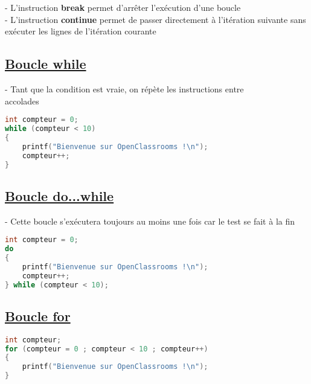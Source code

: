 \documentclass[a3paper,12pt]{article}
\begin{document}
\begin{minipage}[t]{0.49\textwidth}
\begin{tcolorbox}[title=Boucles, fonttitle=\large, top=3pt, bottom=3pt, boxsep=1pt, colback=white,
  colframe=lightpurple, 
  colbacktitle=lightpurple,
  coltitle=white,]
  
- L’instruction  \textbf{break}  permet d'arrêter l’exécution d’une boucle\\

- L’instruction  \textbf{continue}  permet de passer directement à l’itération suivante sans exécuter les lignes de l’itération courante
\subsection*{{\small \underline{Boucle while}}}
- Tant que la condition est vraie, on répète les instructions entre\\ accolades
\begin{lstlisting}[language=C,showstringspaces=false]
int compteur = 0;
while (compteur < 10)
{
    printf("Bienvenue sur OpenClassrooms !\n");
    compteur++;
}
\end{lstlisting}
\vspace{-1em}
\subsection*{{\small \underline{Boucle do...while}}}
- Cette boucle s'exécutera toujours au moins une fois car le test se fait à la fin

\begin{lstlisting}[language=C,showstringspaces=false]
int compteur = 0;
do
{
    printf("Bienvenue sur OpenClassrooms !\n");
    compteur++;
} while (compteur < 10);
\end{lstlisting}
\vspace{-1em}
\subsection*{{\small \underline{Boucle for}}}
\vspace{-1em}
\begin{lstlisting}[language=C,showstringspaces=false]
int compteur;
for (compteur = 0 ; compteur < 10 ; compteur++)
{
    printf("Bienvenue sur OpenClassrooms !\n");
}
\end{lstlisting}

\end{tcolorbox}
\end{minipage}
\end{document}
